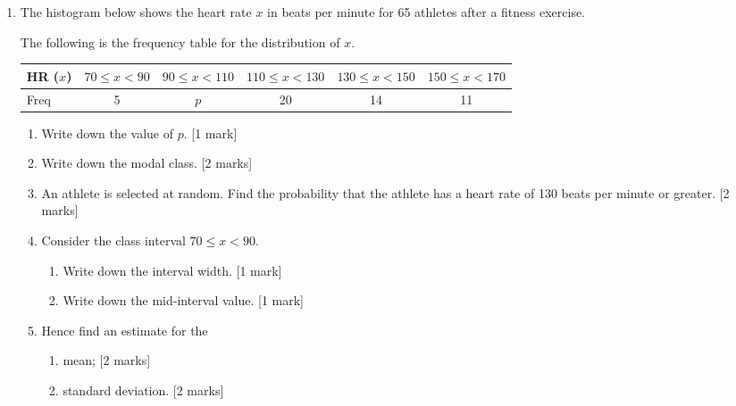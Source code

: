 \documentclass[12pt, twoside]{article}
\begin{document}
\begin{enumerate}
\newpage
  \item The histogram below shows the heart rate $x$ in beats per minute for 65 athletes after a fitness exercise.

    \begin{center}
    \end{center}

    The following is the frequency table for the distribution of $x$. \\[0.25cm]
      \begin{tabular}{|l|c|c|c|c|c|}
        \hline
        HR ($x$) & $70 \leq x < 90$ & $90 \leq x < 110$ & $110 \leq x < 130$ & $130 \leq x < 150$ & $150 \leq x < 170$ \\ 
        \hline 
        Freq & 5 & $p$ & 20 & 14 & 11  \\ 
        \hline 
        \end{tabular}
      \begin{enumerate}
        \item Write down the value of $p$. \hfill [1 mark] \vspace{1cm}
        \item Write down the modal class. \hfill [2 marks] \vspace{1cm}
        \item An athlete is selected at random. Find the probability that the athlete has a heart rate of 130 beats per minute or greater. \hfill [2 marks] \vspace{1cm}
        \item Consider the class interval $70 \leq x < 90$.
        \begin{enumerate}
          \item Write down the interval width. \hfill [1 mark] \vspace{1cm}
          \item Write down the mid-interval value. \hfill [1 mark] 
        \end{enumerate}
        \item Hence find an estimate for the
        \begin{enumerate}
          \item mean; \hfill [2 marks] \vspace{1cm}
          \item standard deviation. \hfill [2 marks] 
        \end{enumerate}
      \end{enumerate}


\end{enumerate}
\end{document}
